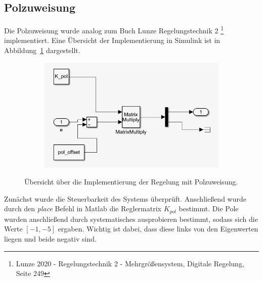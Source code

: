 \subsection{Polzuweisung}\label{subsec:polzuweisung}
Die Polzuweisung wurde analog zum Buch Lunze Regelungstechnik 2 \footnote{Lunze
2020 - Regelungstechnik 2 - Mehrgrößensystem, Digitale Regelung, Seite 249}
implementiert. Eine Übersicht der Implementierung in Simulink ist in
Abbildung~\ref{fig:polzuw} dargestellt.
\begin{figure}[hbt]
\centering
\begin{subfigure}{0.49\textwidth}
    \centering
    \includegraphics*[width=\textwidth]{figures/polzuw_ueb.png}
\end{subfigure}
    \caption{Übersicht über die Implementierung der Regelung mit Polzuweisung.
    \label{fig:polzuw}}
\end{figure}    

Zunächst wurde die Steuerbarkeit des Systems überprüft. Anschließend wurde durch
den \textit{place} Befehl in Matlab die Reglermatrix $K_{pol}$ bestimmt. Die
Pole wurden anschließend durch systematisches ausprobieren bestimmt, sodass sich
die Werte $[-1, -5]$ ergaben. Wichtig ist dabei, dass diese links von den
Eigenwerten liegen und beide negativ sind.

